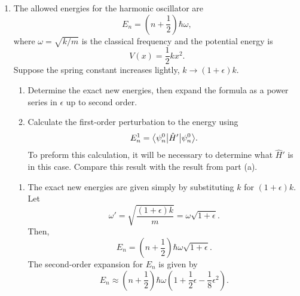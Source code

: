 \documentclass[a4paper, 12pt]{config/homework}
\begin{document}
\begin{enumerate}
\pagebreak
\item The allowed energies for the harmonic oscillator are
\[E_n = \left(n + \frac{1}{2}\right)\hbar\omega,\]
where \(\omega = \sqrt{k/m}\) is the classical frequency and the potential energy is
\[V(x) = \frac{1}{2}kx^2.\]
Suppose the spring constant increases lightly, \(k\to\left(1+\epsilon\right)k\).
\begin{enumerate}[label=(\alph*)]
\item Determine the exact new energies, then expand the formula as a power series in \(\epsilon\) up to second order.
\item Calculate the first-order perturbation to the energy using
\[E_n^1=\bra*{\psi_n^0}\hat{H}'\ket*{\psi_n^0}.\]
To preform this calculation, it will be necessary to determine what \(\hat{H}'\) is in this case. Compare this result with the result from part (a).
\end{enumerate}
\bigskip
\begin{enumerate}[label=(\alph*)]
\item The exact new energies are given simply by substituting \(k\) for \((1+\epsilon)k\). Let
\[\omega' = \sqrt{\frac{(1+\epsilon)k}{m}} = \omega\sqrt{1+\epsilon}.\]
Then,
\[E_n = \left(n+\frac{1}{2}\right)\hbar\omega\sqrt{1+\epsilon}.\]
The second-order expansion for \(E_n\) is given by
\[E_n \approx \left(n+\frac{1}{2}\right)\hbar\omega\left(1 + \frac{1}{2}\epsilon - \frac{1}{8}\epsilon^2\right).\]


\end{enumerate}
\end{enumerate}
\end{document}
